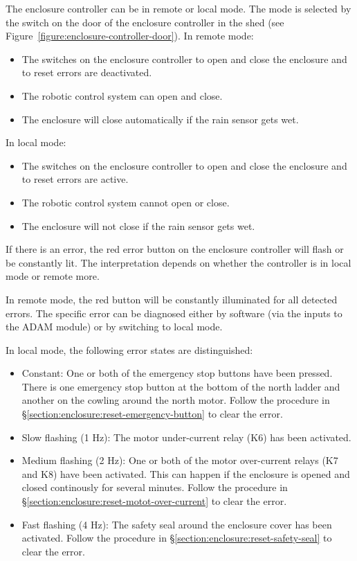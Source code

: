 The enclosure controller can be in remote or local mode. The mode is selected by the switch on the door of the enclosure controller in the shed (see Figure~\ref{figure:enclosure-controller-door}). In remote mode:
\begin{itemize}
\item
The switches on the enclosure controller to open and close the enclosure and to reset errors are deactivated.
\item
The robotic control system can open and close. 
\item
The enclosure will close automatically if the rain sensor gets wet.
\end{itemize}
In local mode:
\begin{itemize}
\item
The switches on the enclosure controller to open and close the enclosure and to reset errors are active.
\item
The robotic control system cannot open or close. 
\item
The enclosure will not close if the rain sensor gets wet.
\end{itemize}

If there is an error, the red error button on the enclosure controller will flash or be constantly lit. The interpretation depends on whether the controller is in local mode or remote more.

In remote mode, the red button will be constantly illuminated for all detected errors. The specific error can be diagnosed either by software (via the inputs to the ADAM module) or by switching to local mode.

In local mode, the following error states are distinguished:

\begin{itemize}
\item Constant: One or both of the emergency stop buttons have been pressed. There is one emergency stop button at the bottom of the north ladder and another on the cowling around the north motor. Follow the procedure in \S\ref{section:enclosure:reset-emergency-button} to clear the error.
\item Slow flashing (1 Hz): The motor under-current relay (K6) has been activated.
\item Medium flashing (2 Hz): One or both of the motor over-current relays (K7 and K8) have been activated. This can happen if the enclosure is opened and closed continously for several minutes. Follow the procedure in \S\ref{section:enclosure:reset-motot-over-current} to clear the error.
\item Fast flashing (4 Hz): The safety seal around the enclosure cover has been activated. Follow the procedure in \S\ref{section:enclosure:reset-safety-seal} to clear the error.
\end{itemize}

